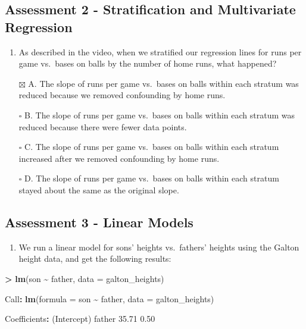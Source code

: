 \documentclass[
]{article}
\newenvironment{Shaded}{\begin{snugshade}}{\end{snugshade}}
\newcommand{\DataTypeTok}[1]{\textcolor[rgb]{0.13,0.29,0.53}{#1}}
\newcommand{\FloatTok}[1]{\textcolor[rgb]{0.00,0.00,0.81}{#1}}
\newcommand{\KeywordTok}[1]{\textcolor[rgb]{0.13,0.29,0.53}{\textbf{#1}}}
\newcommand{\NormalTok}[1]{#1}
\newcommand{\OperatorTok}[1]{\textcolor[rgb]{0.81,0.36,0.00}{\textbf{#1}}}
\newcommand{\StringTok}[1]{\textcolor[rgb]{0.31,0.60,0.02}{#1}}
\providecommand{\tightlist}{%
  \setlength{\itemsep}{0pt}\setlength{\parskip}{0pt}}
\begin{document}
\hypertarget{assessment-2---stratification-and-multivariate-regression}{%
\subsection{Assessment 2 - Stratification and Multivariate
Regression}\label{assessment-2---stratification-and-multivariate-regression}}

\begin{enumerate}
\def\labelenumi{\arabic{enumi}.}
\tightlist
\item
  As described in the video, when we stratified our regression lines for
  runs per game vs.~bases on balls by the number of home runs, what
  happened?
\end{enumerate}

\begin{itemize}
\tightlist
\item[$\boxtimes$]
  A. The slope of runs per game vs.~bases on balls within each stratum
  was reduced because we removed confounding by home runs.
\item[$\square$]
  B. The slope of runs per game vs.~bases on balls within each stratum
  was reduced because there were fewer data points.
\item[$\square$]
  C. The slope of runs per game vs.~bases on balls within each stratum
  increased after we removed confounding by home runs.
\item[$\square$]
  D. The slope of runs per game vs.~bases on balls within each stratum
  stayed about the same as the original slope.
\end{itemize}

\hypertarget{assessment-3---linear-models}{%
\subsection{Assessment 3 - Linear
Models}\label{assessment-3---linear-models}}

\begin{enumerate}
\def\labelenumi{\arabic{enumi}.}
\tightlist
\item
  We run a linear model for sons' heights vs.~fathers' heights using the
  Galton height data, and get the following results:
\end{enumerate}

\begin{Shaded}
\begin{Highlighting}[]
\OperatorTok{\textgreater{}}\StringTok{ }\KeywordTok{lm}\NormalTok{(son }\OperatorTok{\textasciitilde{}}\StringTok{ }\NormalTok{father, }\DataTypeTok{data =}\NormalTok{ galton\_heights)}

\NormalTok{Call}\OperatorTok{:}
\KeywordTok{lm}\NormalTok{(}\DataTypeTok{formula =}\NormalTok{ son }\OperatorTok{\textasciitilde{}}\StringTok{ }\NormalTok{father, }\DataTypeTok{data =}\NormalTok{ galton\_heights)}

\NormalTok{Coefficients}\OperatorTok{:}
\NormalTok{(Intercept)    father  }
    \FloatTok{35.71}       \FloatTok{0.50}  
\end{Highlighting}
\end{Shaded}
\end{document}
